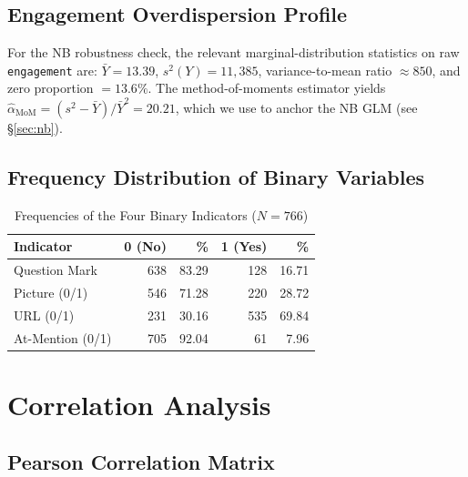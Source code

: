\documentclass[12pt,a4paper]{article}
\begin{document}
\subsection{Engagement Overdispersion Profile}

For the NB robustness check, the relevant marginal-distribution statistics on raw \texttt{engagement} are: $\bar Y=13.39$, $s^2(Y)=11{,}385$, variance-to-mean ratio $\approx 850$, and zero proportion $=13.6\%$. The method-of-moments estimator yields $\hat\alpha_{\text{MoM}}=(s^2-\bar Y)/\bar Y^2 = 20.21$, which we use to anchor the NB GLM (see §\ref{sec:nb}).

\subsection{Frequency Distribution of Binary Variables}

\begin{table}[H]
\centering
\caption{Frequencies of the Four Binary Indicators ($N=766$)}
\small
\begin{tabular}{lrrrr}
\toprule
Indicator & 0 (No) & \% & 1 (Yes) & \% \\
\midrule
Question Mark & 638 & 83.29 & 128 & 16.71 \\
Picture (0/1) & 546 & 71.28 & 220 & 28.72 \\
URL (0/1) & 231 & 30.16 & 535 & 69.84 \\
At-Mention (0/1) & 705 & 92.04 & 61 & 7.96 \\
\bottomrule
\end{tabular}
\end{table}

\newpage

\section{Correlation Analysis}

\subsection{Pearson Correlation Matrix}
\end{document}
